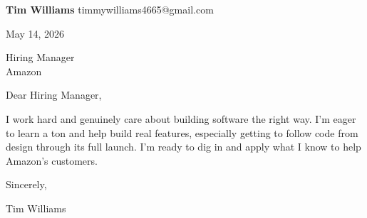 \documentclass[12pt]{article}
\begin{document}
\textbf{Tim Williams} \hfill timmywilliams4665@gmail.com

\vspace{1em}

May 14, 2026

\vspace{1em}

Hiring Manager \\
Amazon

\vspace{1em}

Dear Hiring Manager,

I work hard and genuinely care about building software the right way. I'm eager to learn a ton and help build real features, especially getting to follow code from design through its full launch. I'm ready to dig in and apply what I know to help Amazon's customers.

\vspace{1em}

Sincerely,

\vspace{2em}

Tim Williams
\end{document}
